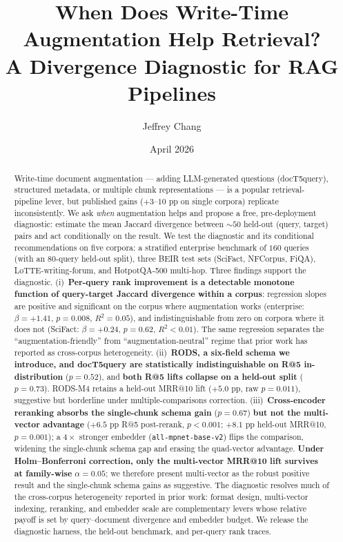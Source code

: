 \documentclass[11pt]{article}
\title{When Does Write-Time Augmentation Help Retrieval?\\
       A Divergence Diagnostic for RAG Pipelines}
\author{Jeffrey Chang}
\date{April 2026}
\begin{document}
\maketitle

\begin{abstract}
Write-time document augmentation --- adding LLM-generated questions
(docT5query), structured metadata, or multiple chunk representations
--- is a popular retrieval-pipeline lever, but published gains
($+3$--$10$ pp on single corpora) replicate inconsistently. We ask
\emph{when} augmentation helps and propose a free, pre-deployment
diagnostic: estimate the mean Jaccard divergence between $\sim 50$
held-out (query, target) pairs and act conditionally on the result.
We test the diagnostic and its conditional recommendations on five
corpora: a stratified enterprise benchmark of $160$ queries (with an
$80$-query held-out split), three BEIR test sets (SciFact, NFCorpus,
FiQA), LoTTE-writing-forum, and HotpotQA-500 multi-hop. Three findings
support the diagnostic. (i)~\textbf{Per-query rank improvement is a
detectable monotone function of query-target Jaccard divergence
within a corpus}: regression slopes are positive and significant on
the corpus where augmentation works (enterprise: $\beta{=}{+}1.41$,
$p{=}0.008$, $R^{2}{=}0.05$), and indistinguishable from zero on
corpora where it does not (SciFact: $\beta{=}{+}0.24$, $p{=}0.62$,
$R^{2}{<}0.01$). The same regression separates the
``augmentation-friendly'' from ``augmentation-neutral'' regime that
prior work has reported as cross-corpus heterogeneity.
(ii)~\textbf{RODS, a six-field schema we introduce, and docT5query
are statistically indistinguishable on R@5 in-distribution}
($p{=}0.52$), and \textbf{both R@5 lifts collapse on a held-out
split} ($p{=}0.73$). RODS-M4 retains a held-out MRR@10 lift
($+5.0$ pp, raw $p{=}0.011$), suggestive but borderline under
multiple-comparisons correction. (iii)~\textbf{Cross-encoder reranking
absorbs the single-chunk schema gain} ($p{=}0.67$) \textbf{but not
the multi-vector advantage} ($+6.5$ pp R@5 post-rerank, $p{<}0.001$;
$+8.1$ pp held-out MRR@10, $p{=}0.001$); a $4{\times}$ stronger
embedder (\texttt{all-mpnet-base-v2}) flips the comparison, widening
the single-chunk schema gap and erasing the quad-vector advantage.
\textbf{Under Holm--Bonferroni correction, only the multi-vector
MRR@10 lift survives at family-wise} $\alpha{=}0.05$; we therefore
present multi-vector as the robust positive result and the
single-chunk schema gains as suggestive. The diagnostic resolves
much of the cross-corpus heterogeneity reported in prior work:
format design, multi-vector indexing, reranking, and embedder scale
are complementary levers whose relative payoff is set by
query--document divergence and embedder budget. We release the diagnostic harness, the held-out
benchmark, and per-query rank traces.
\end{abstract}
\end{document}
